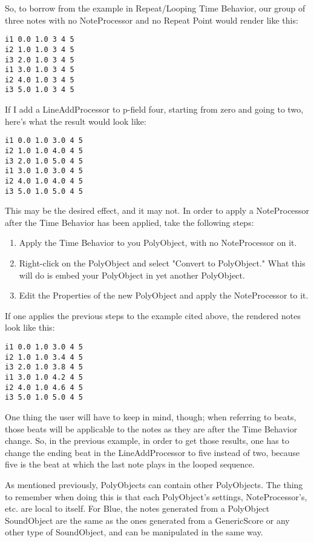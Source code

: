 So, to borrow from the example in Repeat/Looping Time Behavior, our
group of three notes with no NoteProcessor and no Repeat Point would
render like this:

\begin{verbatim}
i1 0.0 1.0 3 4 5
i2 1.0 1.0 3 4 5
i3 2.0 1.0 3 4 5
i1 3.0 1.0 3 4 5
i2 4.0 1.0 3 4 5
i3 5.0 1.0 3 4 5
\end{verbatim}

If I add a LineAddProcessor to p-field four, starting from zero and
going to two, here's what the result would look like:

\begin{verbatim}
i1 0.0 1.0 3.0 4 5
i2 1.0 1.0 4.0 4 5
i3 2.0 1.0 5.0 4 5
i1 3.0 1.0 3.0 4 5
i2 4.0 1.0 4.0 4 5
i3 5.0 1.0 5.0 4 5
\end{verbatim}

This may be the desired effect, and it may not. In order to apply a
NoteProcessor after the Time Behavior has been applied, take the
following steps:

\begin{enumerate}
\def\labelenumi{\arabic{enumi}.}
\item
  Apply the Time Behavior to you PolyObject, with no NoteProcessor on
  it.
\item
  Right-click on the PolyObject and select "Convert to PolyObject." What
  this will do is embed your PolyObject in yet another PolyObject.
\item
  Edit the Properties of the new PolyObject and apply the NoteProcessor
  to it.
\end{enumerate}

If one applies the previous steps to the example cited above, the
rendered notes look like this:

\begin{verbatim}
i1 0.0 1.0 3.0 4 5
i2 1.0 1.0 3.4 4 5
i3 2.0 1.0 3.8 4 5
i1 3.0 1.0 4.2 4 5
i2 4.0 1.0 4.6 4 5
i3 5.0 1.0 5.0 4 5
\end{verbatim}

One thing the user will have to keep in mind, though; when referring to
beats, those beats will be applicable to the notes as they are after the
Time Behavior change. So, in the previous example, in order to get those
results, one has to change the ending beat in the LineAddProcessor to
five instead of two, because five is the beat at which the last note
plays in the looped sequence.

As mentioned previously, PolyObjects can contain other PolyObjects. The
thing to remember when doing this is that each PolyObject's settings,
NoteProcessor's, etc. are local to itself. For Blue, the notes generated
from a PolyObject SoundObject are the same as the ones generated from a
GenericScore or any other type of SoundObject, and can be manipulated in
the same way.

